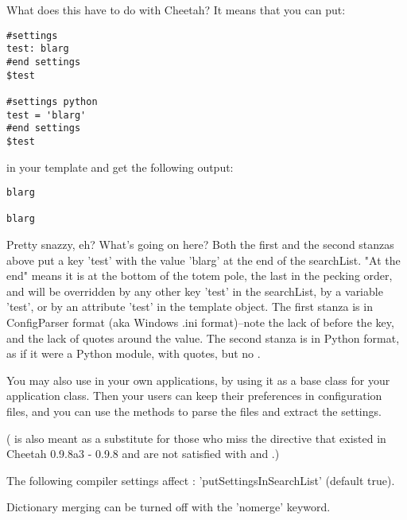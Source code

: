 What does this have to do with Cheetah?  It means that you can put:

\begin{verbatim}
#settings
test: blarg
#end settings
$test

#settings python
test = 'blarg'
#end settings
$test
\end{verbatim}

in your template and get the following output:

\begin{verbatim}
blarg

blarg
\end{verbatim}

Pretty snazzy, eh?  What's going on here?  Both the first and the second
stanzas above put a key 'test' with the value 'blarg' at the end of the 
searchList.  "At the end" means it is at the bottom of the totem pole,
the last in the pecking order, and will be overridden by any other key
'test' in the searchList, by a  variable 'test', or by an attribute
'test' in the template object.  The first stanza is in ConfigParser format
(aka Windows .ini format)--note the lack of \code{\$} before the key, and the
lack of quotes around the value.  The
second stanza is in Python format, as if it were a Python module, with
quotes, but no \code{\$}.


You may also use  in your own applications, by using it
as a base class for your application class.  Then your users can keep their
preferences in configuration files, and you can use the 
 methods to parse the files and extract the settings.

( is also meant as a substitute for those who miss the
 directive that existed in Cheetah 0.9.8a3 - 0.9.8 and are not
satisfied with  and .)

The following compiler settings affect :
'putSettingsInSearchList' (default true).

Dictionary merging can be turned off with the 'nomerge' keyword.



